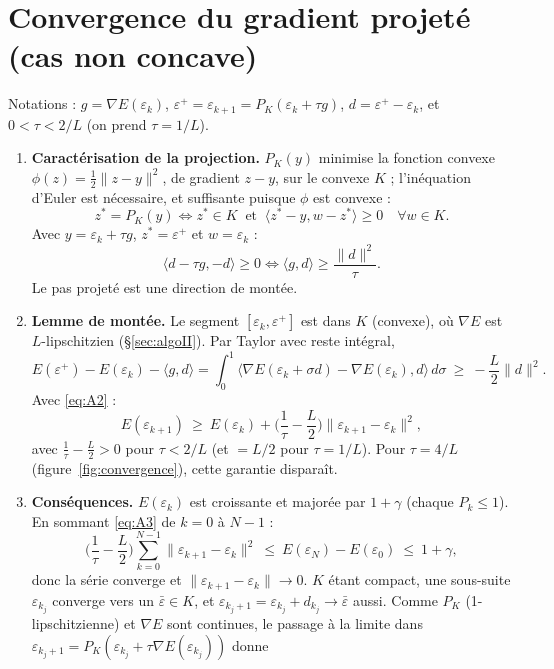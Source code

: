 \documentclass[11pt,a4paper]{article}
\newcommand{\sca}[2]{\langle #1,#2\rangle}
\newcommand{\nr}[1]{\|#1\|}
\theoremstyle{plain}
\theoremstyle{definition}
\begin{document}
\section{Convergence du gradient projeté (cas non concave)}\label{app:convergence}
Notations : $g=\nabla E(\varepsilon_k)$, $\varepsilon^+=\varepsilon_{k+1}=P_K(\varepsilon_k+\tau g)$, $d=\varepsilon^+-\varepsilon_k$, et $0<\tau<2/L$ (on prend $\tau=1/L$).
\begin{enumerate}
\item \textbf{Caractérisation de la projection.} $P_K(y)$ minimise la fonction convexe $\phi(z)=\tfrac12\nr{z-y}^2$, de gradient $z-y$, sur le convexe $K$ ; l'inéquation d'Euler est nécessaire, et suffisante puisque $\phi$ est convexe :
\begin{equation*}\label{eq:A1}
z^*=P_K(y)\iff z^*\in K\ \text{ et }\ \sca{z^*-y}{w-z^*}\ge0\quad\forall w\in K.\tag{A.1}
\end{equation*}
Avec $y=\varepsilon_k+\tau g$, $z^*=\varepsilon^+$ et $w=\varepsilon_k$ :
\begin{equation*}\label{eq:A2}
\sca{d-\tau g}{-d}\ge0\iff\sca{g}{d}\ge\frac{\nr{d}^2}{\tau}.\tag{A.2}
\end{equation*}
Le pas projeté est une direction de montée.
\item \textbf{Lemme de montée.} Le segment $[\varepsilon_k,\varepsilon^+]$ est dans $K$ (convexe), où $\nabla E$ est $L$-lipschitzien (§\ref{sec:algoII}). Par Taylor avec reste intégral,
\[E(\varepsilon^+)-E(\varepsilon_k)-\sca{g}{d}=\int_0^1\sca{\nabla E(\varepsilon_k+\sigma d)-\nabla E(\varepsilon_k)}{d}\,d\sigma\ \ge\ -\frac L2\nr{d}^2.\]
Avec \eqref{eq:A2} :
\begin{equation*}\label{eq:A3}
E(\varepsilon_{k+1})\ \ge\ E(\varepsilon_k)+\Big(\frac1\tau-\frac L2\Big)\nr{\varepsilon_{k+1}-\varepsilon_k}^2,\tag{A.3}
\end{equation*}
avec $\frac1\tau-\frac L2>0$ pour $\tau<2/L$ (et $=L/2$ pour $\tau=1/L$). Pour $\tau=4/L$ (figure~\ref{fig:convergence}), cette garantie disparaît.
\item \textbf{Conséquences.} $E(\varepsilon_k)$ est croissante et majorée par $1+\gamma$ (chaque $P_k\le1$). En sommant \eqref{eq:A3} de $k=0$ à $N-1$ :
\[\Big(\frac1\tau-\frac L2\Big)\sum_{k=0}^{N-1}\nr{\varepsilon_{k+1}-\varepsilon_k}^2\ \le\ E(\varepsilon_N)-E(\varepsilon_0)\ \le\ 1+\gamma,\]
donc la série converge et $\nr{\varepsilon_{k+1}-\varepsilon_k}\to0$. $K$ étant compact, une sous-suite $\varepsilon_{k_j}$ converge vers un $\bar\varepsilon\in K$, et $\varepsilon_{k_j+1}=\varepsilon_{k_j}+d_{k_j}\to\bar\varepsilon$ aussi. Comme $P_K$ (1-lipschitzienne) et $\nabla E$ sont continues, le passage à la limite dans $\varepsilon_{k_j+1}=P_K(\varepsilon_{k_j}+\tau\nabla E(\varepsilon_{k_j}))$ donne

\end{enumerate}
\end{document}

